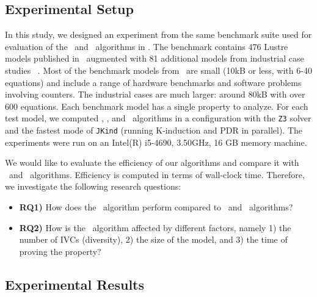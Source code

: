 
\newcommand{\takeaway}[1]{
\vspace{6pt}
\noindent\fbox{\parbox{\textwidth}{#1}}
\vspace{6pt}
}
\subsection{Experimental Setup}
 In this study, we designed an experiment from
 the same benchmark suite used for evaluation of the \ucalg ~and \ucbfalg ~algorithms in \cite{Ghass16}.
 The benchmark contains 476 Lustre models
 published in~\cite{Hagen08:FMCAD} augmented
with 81 additional models from industrial case studies ~\cite{QFCS15:backes,hilt2013}.
 Most of
the benchmark models from~\cite{Hagen08:FMCAD} are small (10kB or less,
with 6-40 equations) and include a range of hardware benchmarks and
software problems involving counters.
The industrial cases are much
larger: around 80kB with over 600 equations.
Each benchmark model has a single property to analyze.
For each test model, we computed \aivcalg , \ucalg , and \ucbfalg ~algorithms
in a configuration with
the \texttt{Z3} solver and the fastest mode of \texttt{JKind} (running K-induction and PDR in parallel). The experiments
were run on an  Intel(R) i5-4690, 3.50GHz,
16 GB memory machine.

We would like to evaluate the efficiency
 of our algorithms and compare it with \ucalg ~and \ucbfalg ~algorithms.
 Efficiency is computed in terms of wall-clock time. Therefore, we investigate the following research questions:
\begin{itemize}
  \item \textbf{RQ1)} How does the \aivcalg ~algorithm perform compared to \ucalg ~and \ucbfalg ~algorithms?
  \item \textbf{RQ2)} How is the \aivcalg ~algorithm affected by different factors, namely 1) the number of IVCs (diversity), 2) the size of the model, and 3) the time of proving the property?
%
\end{itemize}


\subsection{Experimental Results}

 